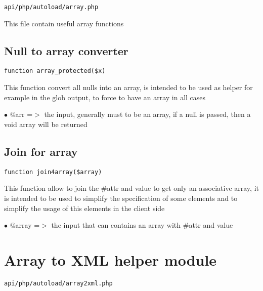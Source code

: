\documentclass[a4paper]{book}
\begin{document}
\begin{lstlisting}
api/php/autoload/array.php
\end{lstlisting}

This file contain useful array functions

\hypertarget{toc35}{}
\subsection{Null to array converter}

\begin{lstlisting}
function array_protected($x)
\end{lstlisting}

This function convert all nulls into an array, is intended to be
used as helper for example in the glob output, to force to have
an array in all cases

\begin{compactitem}
\item[\color{myblue}$\bullet$] @arr =$>$ the input, generally must to be an array, if a null is passed,
        then a void array will be returned
\end{compactitem}

\hypertarget{toc36}{}
\subsection{Join for array}

\begin{lstlisting}
function join4array($array)
\end{lstlisting}

This function allow to join the \#attr and value to get only an associative
array, it is intended to be used to simplify the specification of some elements
and to simplify the usage of this elements in the client side

\begin{compactitem}
\item[\color{myblue}$\bullet$] @array =$>$ the input that can contains an array with \#attr and value
\end{compactitem}

\hypertarget{toc37}{}
\section{Array to XML helper module}

\begin{lstlisting}
api/php/autoload/array2xml.php
\end{lstlisting}
\end{document}
